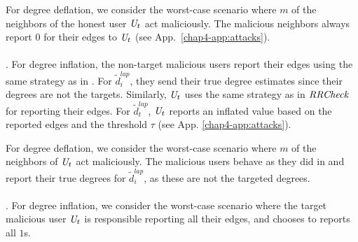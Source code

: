 For degree deflation, we consider the worst-case scenario where $m$ of the neighbors of the honest user $\textit{U}_t$ act maliciously. The malicious neighbors always report $0$ for their edges to $\textit{U}_t$ (see App.~\ref{chap4-app:attacks}).
\\\\
\noindent\DegHybrid. %
For degree inflation, the non-target malicious users report their edges using the same strategy as in \DegRRCheck{}. For $\tilde{d}_i^{lap}$, they send their true degree estimates since their degrees are not the targets. Similarly, $\textit{U}_t$ uses the same strategy as in $\textit{RRCheck}{}$ for reporting their edges. For $\tilde{d}_t^{lap}$, $\textit{U}_t$  reports an inflated value based on the reported edges and the threshold $\tau$ (see  App. \ref{chap4-app:attacks}).

For degree deflation, we consider the worst-case scenario where $m$ of the neighbors of $\textit{U}_t$ act maliciously. The malicious users behave as they did in \DegRRCheck{} and report their true degrees for $\tilde{d}_i^{lap}$, as these are not the targeted degrees.
\\\\
 \noindent\DegRRNaive. For degree inflation, we consider the worst-case scenario where the target malicious user $\textit{U}_t$ is responsible reporting all their edges, and chooses to reports all $1$s. %

